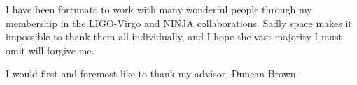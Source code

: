 
I have been fortunate to work with many wonderful people through my
membership in the LIGO-Virgo and NINJA collaborations.  Sadly space makes it
impossible to thank them all individually, and I hope the vast
majority I must omit will forgive me.

I would first and foremost like to thank my advisor, Duncan Brown..

